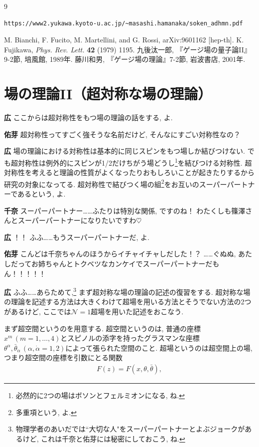 \documentclass{ltjsarticle}
\theoremstyle{definition}
\newcommand{\parno}{\par\noindent}
\begin{document}
\begin{thebibliography}{9}
  \begin{verbatim}
https://www2.yukawa.kyoto-u.ac.jp/~masashi.hamanaka/soken_adhmn.pdf
  \end{verbatim}
   M. Bianchi, F. Fucito, M. Martellini, and G. Rossi, arXiv:9601162 [hep-th].
  \bibitem{} K. Fujikawa, {\it Phys. Rev. Lett.} \textbf{42} (1979) 1195.
  \bibitem{} 九後汰一郎, 『ゲージ場の量子論II』9-2節, 培風館, 1989年.
  \bibitem{} 藤川和男, 『ゲージ場の理論』7-2節, 岩波書店, 2001年.
\end{thebibliography}

\section{場の理論II（超対称な場の理論）}
\noindent
\textbf{広} ここからは超対称性をもつ場の理論の話をする, よ. \parno
\textbf{佑芽} 超対称性ってすごく強そうな名前だけど, そんなにすごい対称性なの？\parno
\textbf{広} 場の理論における対称性は基本的に同じスピンをもつ場しか結びつけない. でも超対称性は例外的にスピンが1/2だけちがう場どうし\footnote{必然的に2つの場はボソンとフェルミオンになる, ね.}を結びつける対称性. 超対称性を考えると理論の性質がよくなったりおもしろいことが起きたりするから研究の対象になってる. 超対称性で結びつく場の組\footnote{多重項という, よ.}をお互いのスーパーパートナーであるという, よ.\parno
\textbf{千奈} スーパーパートナー……ふたりは特別な関係, ですのね！ わたくしも篠澤さんとスーパーパートナーになりたいですわ$\heartsuit$\parno
\textbf{広} ！！ ふふ……もうスーパーパートナーだ, よ.\parno
\textbf{佑芽} こんどは千奈ちゃんのほうからイチャイチャしだした！？ ……ぐぬぬ, あたしだってお姉ちゃんとトクベツなカンケイでスーパーパートナーだもん！！！！！\parno
\textbf{広} ふふ……あらためて,\footnote{物理学者のあいだでは``大切な人"をスーパーパートナーとよぶジョークがあるけど, これは千奈と佑芽には秘密にしておこう, ね.} まず超対称な場の理論の記述の復習をする. 超対称な場の理論を記述する方法は大きくわけて超場を用いる方法とそうでない方法の2つがあるけど, ここでは$\mathcal N=1$超場を用いた記述をおこなう.\par
まず超空間というのを用意する. 超空間というのは, 普通の座標$x^m\,(m=1,\dots,4)$とスピノルの添字を持ったグラスマンな座標$\theta^\alpha,\bar\theta_{\dot\alpha}\,(\alpha,\dot\alpha=1,2)$によって張られた空間のこと. 超場というのは超空間上の場, つまり超空間の座標を引数にとる関数
\begin{gather}
  F(z)=F(x,\theta,\bar\theta),
\end{gather}
\end{document}
